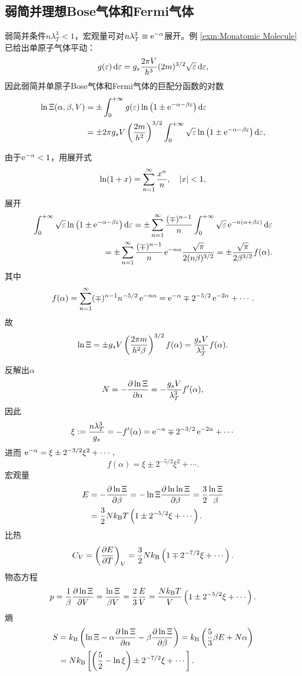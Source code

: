 \subsection{弱简并理想Bose气体和Fermi气体}
弱简并条件$n\lambda_T^3<1$，宏观量可对$n\lambda_T^3\equiv\mathop{}\!\mathrm{e}^{-\alpha}$展开。例 \ref{exm:Monatomic Molecule} 已给出单原子气体平动：
\begin{align}
	g(\varepsilon)\mathop{}\!\mathrm{d}\varepsilon=g_s\frac{2\pi V}{h^3}(2m)^{3/2}\sqrt{\varepsilon}\mathop{}\!\mathrm{d}\varepsilon,
\end{align}
因此弱简并单原子Bose气体和Fermi气体的巨配分函数的对数
\begin{align*}
	\ln\Xi(\alpha,\beta,V) & =\pm\int_0^{+\infty} g(\varepsilon)\ln\left(1\pm\mathop{}\!\mathrm{e}^{-\alpha-\beta\varepsilon}\right)\mathop{}\!\mathrm{d}\varepsilon\\
	&=\pm 2\pi g_sV\left(\frac{2m}{h^2}\right)^{3/2}\int_0^{+\infty}\sqrt{\varepsilon}\ln\left(1\pm\mathop{}\!\mathrm{e}^{-\alpha-\beta\varepsilon}\right)\mathop{}\!\mathrm{d}\varepsilon,
\end{align*}

由于$\mathop{}\!\mathrm{e}^{-\alpha}<1$，用展开式
\[
	\ln(1+ x)=\sum_{n=1}^\infty\frac{x^n}n,\quad\left\lvert x\right\rvert<1,
\]
展开
\begin{align*}
	\int_0^{+\infty}\sqrt{\varepsilon}\ln\left(1\pm\mathop{}\!\mathrm{e}^{-\alpha-\beta\varepsilon}\right)\mathop{}\!\mathrm{d}\varepsilon=\pm\sum_{n=1}^\infty\frac{(\mp)^{n-1}}n\int_0^{+\infty}\sqrt{\varepsilon}\mathop{}\!\mathrm{e}^{-n(\alpha+\beta\varepsilon)}\mathop{}\!\mathrm{d}\varepsilon \\
	=\pm\sum_{n=1}^\infty\frac{(\mp )^{n-1}}n\mathop{}\!\mathrm{e}^{-n\alpha}\frac{\sqrt\pi}{2(n\beta)^{3/2}}=\pm\frac{\sqrt\pi}{2\beta^{3/2}}f(\alpha).
\end{align*}
其中
\[
	f(\alpha)=\sum_{n=1}^\infty(\mp)^{n-1}n^{-5/2}\mathop{}\!\mathrm{e}^{-n\alpha}=\mathop{}\!\mathrm{e}^{-\alpha}\mp 2^{-5/2}\mathop{}\!\mathrm{e}^{-2\alpha}+\cdots.
\]
故
\begin{align}
	\ln\Xi=\pm g_sV\left(\frac{2\pi m}{h^2\beta}\right)^{3/2}f(\alpha)=\frac{g_sV}{\lambda_T^3}f(\alpha).
\end{align}

反解出$\alpha$
\[
	N=-\frac{\partial^{\;\!\!}\ln\Xi}{\partial \alpha^{\;\!\!}}=-\frac{g_sV}{\lambda_T^3}f'(\alpha),
\]
因此
\[
	\xi:=\frac{n\lambda_T^3}{g_s}=-f'(\alpha)=\mathop{}\!\mathrm{e}^{-\alpha}\mp 2^{-3/2}\mathop{}\!\mathrm{e}^{-2\alpha}+\cdots
\]
进而
\(\mathop{}\!\mathrm{e}^{-\alpha}=\xi\pm{2^{-3/2}}\xi^2+\cdots,\)
\[
	f(\alpha)=\xi\pm 2^{-5/2}\xi^2+\cdots.
\]
宏观量
\begin{align}\notag
	E & =-\pv{\ln\Xi}\beta=-\ln\Xi\pv{\ln\ln\Xi}\beta=\frac32\frac{\ln\Xi}\beta \\
	  & =\frac32N\kB T\kh{1\pm 2^{-5/2}\xi+\cdots}.
\end{align}
比热
\begin{align}
	C_V=\left(\frac{\partial^{\;\!\!}E}{\partial T^{\;\!\!}}\right)_V=\frac32Nk_{\mathrm B}\left(1\mp 2^{-7/2}\xi+\cdots\right).
\end{align}
物态方程
\begin{align}
	p=\frac1\beta\frac{\partial^{\;\!\!}\ln\Xi}{\partial V^{\;\!\!}}=\frac{\ln\Xi}{\beta V}=\frac23\frac EV=\frac{Nk_{\mathrm B} T}V\left(1\pm 2^{-5/2}\xi+\cdots\right).
\end{align}
熵
\begin{align}\notag
	S&=\kB\kh{\ln\Xi-\alpha\pv{\ln\Xi}\alpha-\beta\pv{\ln\Xi}\beta}=\kB\kh{\frac53\beta E+N\alpha}\\
	&=N\kB\fkh{\kh{\frac52-\ln\xi}\pm 2^{-7/2}\xi+\cdots}.
\end{align}
